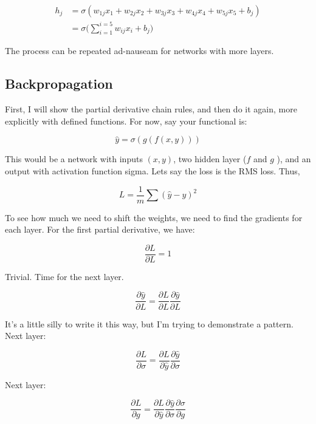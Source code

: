 \begin{align}
    h_j &= \sigma(w_{1j}x_1 + w_{2j}x_2 + w_{3j}x_3 + w_{4j}x_4 + w_{5j}x_5 + b_j) \\
        &= \sigma\Big(\sum_{i=1}^{i=5}w_{ij}x_{i} + b_j\Big)
\end{align}

The process can be repeated ad-nauseam for networks with more layers.

\subsection{Backpropagation}
First, I will show the partial derivative chain rules, and then do it again, more explicitly with defined functions. For now, say your functional is:

\begin{equation}
    \hat{y} = \sigma\left(g\left(f(x,y)\right)\right)
\end{equation}

This would be a network with inputs $(x,y)$, two hidden layer ($ f $  and $ g $ ), and an output with activation function sigma. Lets say the loss is the RMS loss. Thus,

\begin{equation}
    L = \frac{1}{m} \sum (\hat{y} - y)^2
\end{equation}

To see how much we need to shift the weights, we need to find the gradients for each layer. For the first partial derivative, we have:

\begin{equation}
    \frac{\partial L}{\partial L} = 1
\end{equation}

Trivial. Time for the next layer.

\begin{equation}
\frac{\partial \hat{y}}{\partial L} = \frac{\partial L}{\partial L}\frac{\partial \hat{y}}{\partial L}
\end{equation}


It's a little silly to write it this way, but I'm trying to demonstrate a pattern. Next layer:

\begin{equation}
\frac{\partial L}{\partial \sigma} = \frac{\partial L}{\partial \hat{y}} \frac{\partial \hat{y}}{\partial \sigma}
\end{equation}

Next layer:


\begin{equation}
    \frac{\partial L}{\partial g} = \frac{\partial L}{\partial \hat{y}} \frac{\partial \hat{y}}{\partial \sigma} \frac{\partial \sigma}{\partial g}
\end{equation}

